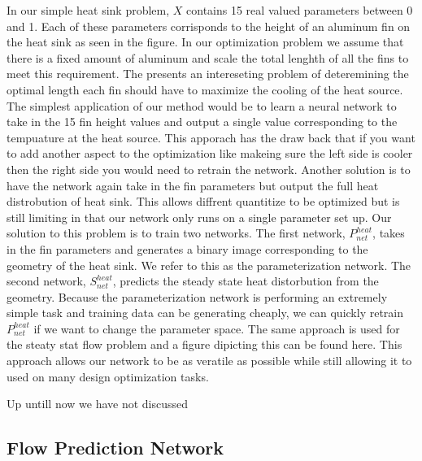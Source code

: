 \documentclass{article} %
\begin{document}
In our simple heat sink problem, $X$ contains 15 real valued parameters between 0 and 1. Each of these parameters corrisponds to the height of an aluminum fin on the heat sink as seen in the figure. In our optimization problem we assume that there is a fixed amount of aluminum and scale the total lenghth of all the fins to meet this requirement. The presents an intereseting problem of deteremining the optimal length each fin should have to maximize the cooling of the heat source. The simplest application of our method would be to learn a neural network to take in the 15 fin height values and output a single value corresponding to the tempuature at the heat source. This apporach has the draw back that if you want to add another aspect to the optimization like makeing sure the left side is cooler then the right side you would need to retrain the network. Another solution is to have the network again take in the fin parameters but output the full heat distrobution of heat sink. This allows diffrent quantitize to be optimized but is still limiting in that our network only runs on a single parameter set up. Our solution to this problem is to train two networks. The first network, $P^{heat}_{net}$, takes in the fin parameters and generates a binary image corresponding to the geometry of the heat sink. We refer to this as the parameterization network. The second network, $S^{heat}_{net}$, predicts the steady state heat distorbution from the geometry. Because the parameterization network is performing an extremely simple task and training data can be generating cheaply, we can quickly retrain $P^{heat}_{net}$ if we want to change the parameter space. The same approach is used for the steaty stat flow problem and a figure dipicting this can be found here. This approach allows our network to be as veratile as possible while still allowing it to used on many design optimization tasks.

Up untill now we have not discussed 

\subsection{Flow Prediction Network}
\end{document}

